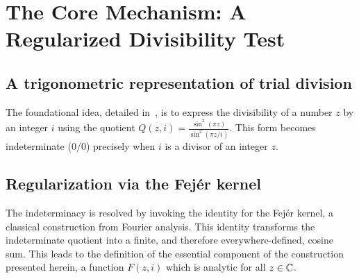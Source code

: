\section{The Core Mechanism: A Regularized Divisibility Test}

\subsection{A trigonometric representation of trial division}
The foundational idea, detailed in~\cite{fuchs2025}, is to express the divisibility of a number $z$ by an integer $i$ using the quotient $Q(z,i) = \frac{\sin^2(\pi z)}{\sin^2(\pi z/i)}$. This form becomes indeterminate ($0/0$) precisely when $i$ is a divisor of an integer $z$.

\subsection{Regularization via the Fej\'er kernel}
The indeterminacy is resolved by invoking the identity for the Fej\'er kernel, a classical construction from Fourier analysis. This identity transforms the indeterminate quotient into a finite, and therefore everywhere-defined, cosine sum. This leads to the definition of the essential component of the construction presented herein, a function $F(z,i)$ which is analytic for all $z \in \mathbb{C}$.

